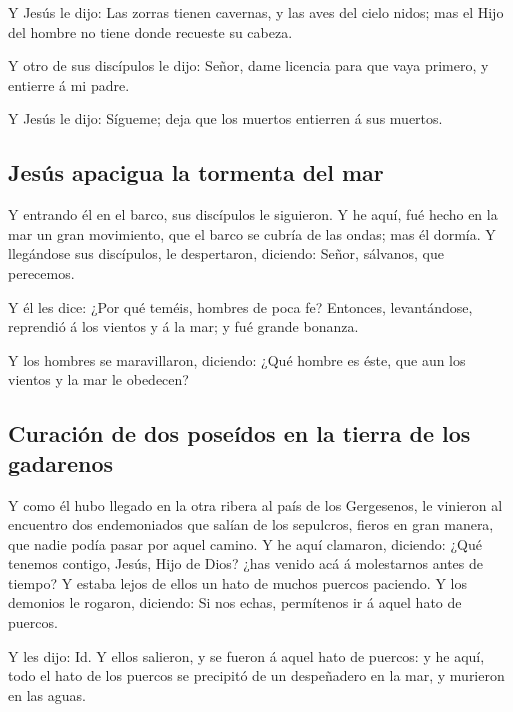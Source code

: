  Y Jesús le dijo: Las zorras tienen cavernas, y las aves
del cielo nidos; mas el Hijo del hombre no tiene donde recueste su
cabeza.

 Y otro de sus discípulos le dijo: Señor, dame licencia
para que vaya primero, y entierre á mi padre.

 Y Jesús le dijo: Sígueme; deja que los muertos entierren
á sus muertos.

\hypertarget{jesuxfas-apacigua-la-tormenta-del-mar}{%
\subsection{Jesús apacigua la tormenta del
mar}\label{jesuxfas-apacigua-la-tormenta-del-mar}}

 Y entrando él en el barco, sus discípulos le siguieron.
 Y he aquí, fué hecho en la mar un gran movimiento, que
el barco se cubría de las ondas; mas él dormía.  Y
llegándose sus discípulos, le despertaron, diciendo: Señor, sálvanos,
que perecemos.

 Y él les dice: ¿Por qué teméis, hombres de poca fe?
Entonces, levantándose, reprendió á los vientos y á la mar; y fué grande
bonanza.

 Y los hombres se maravillaron, diciendo: ¿Qué hombre es
éste, que aun los vientos y la mar le obedecen?

\hypertarget{curaciuxf3n-de-dos-poseuxeddos-en-la-tierra-de-los-gadarenos}{%
\subsection{Curación de dos poseídos en la tierra de los
gadarenos}\label{curaciuxf3n-de-dos-poseuxeddos-en-la-tierra-de-los-gadarenos}}

 Y como él hubo llegado en la otra ribera al país de los
Gergesenos, le vinieron al encuentro dos endemoniados que salían de los
sepulcros, fieros en gran manera, que nadie podía pasar por aquel
camino.  Y he aquí clamaron, diciendo: ¿Qué tenemos
contigo, Jesús, Hijo de Dios? ¿has venido acá á molestarnos antes de
tiempo?  Y estaba lejos de ellos un hato de muchos
puercos paciendo.  Y los demonios le rogaron, diciendo:
Si nos echas, permítenos ir á aquel hato de puercos.

 Y les dijo: Id. Y ellos salieron, y se fueron á aquel
hato de puercos: y he aquí, todo el hato de los puercos se precipitó de
un despeñadero en la mar, y murieron en las aguas.

